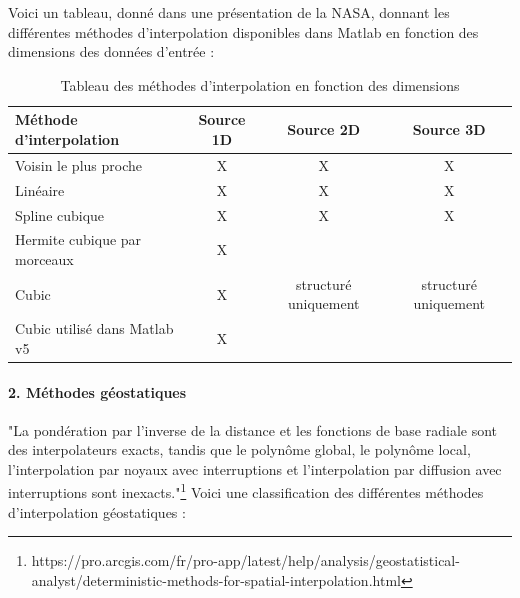Voici un tableau, donné dans une présentation de la NASA\cite{nasa}, donnant les différentes méthodes d'interpolation disponibles dans Matlab en fonction des dimensions des données d'entrée :
\begin{table}[ht]
    \centering
    \begin{tabular}{|l|c|c|c|}
    \hline
    \textbf{Méthode d'interpolation} & \textbf{Source 1D} & \textbf{Source 2D} & \textbf{Source 3D} \\ \hline
    Voisin le plus proche & X & X & X \\ \hline
    Linéaire & X & X & X \\ \hline
    Spline cubique & X & X & X \\ \hline
    Hermite cubique par morceaux & X & & \\ \hline
    Cubic & X & structuré uniquement & structuré uniquement \\ \hline %
    Cubic utilisé dans Matlab v5 & X & & \\ \hline
    \end{tabular}
    \caption{Tableau des méthodes d'interpolation en fonction des dimensions}
    \label{tab:interpolation_methods}
\end{table}


\paragraph{2. Méthodes géostatiques}
\phantom{-}
\newline
"La pondération par l’inverse de la distance et les fonctions de base radiale sont des interpolateurs exacts, tandis que le polynôme global, le polynôme local, l’interpolation par noyaux avec interruptions et l’interpolation par diffusion avec interruptions sont inexacts."\footnote{https://pro.arcgis.com/fr/pro-app/latest/help/analysis/geostatistical-analyst/deterministic-methods-for-spatial-interpolation.html}
Voici une classification des différentes méthodes d'interpolation géostatiques :

